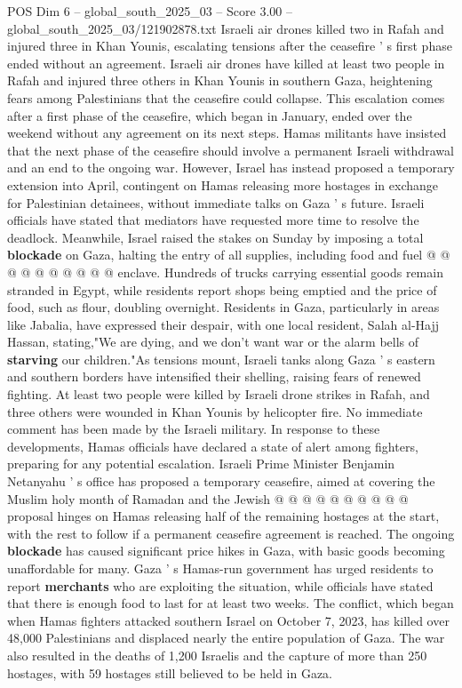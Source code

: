 \begin{textsample}{POS Dim 6 – global\_south\_2025\_03 – Score 3.00 – global\_south\_2025\_03/121902878.txt}  \label{ex:f6_pos_317}
Israeli air drones killed two in Rafah and injured three in Khan Younis, escalating tensions after the ceasefire ' s first phase ended without an agreement.
Israeli air drones have killed at least two people in Rafah and injured three others in Khan Younis in southern Gaza, heightening fears among Palestinians that the ceasefire could collapse.
This escalation comes after a first phase of the ceasefire, which began in January, ended over the weekend without any agreement on its next steps.
Hamas militants have insisted that the next phase of the ceasefire should involve a permanent Israeli withdrawal and an end to the ongoing war.
However, Israel has instead proposed a temporary extension into April, contingent on Hamas releasing more hostages in exchange for Palestinian detainees, without immediate talks on Gaza ' s future.
Israeli officials have stated that mediators have requested more time to resolve the deadlock.
Meanwhile, Israel raised the stakes on Sunday by imposing a total \textbf{blockade} on Gaza, halting the entry of all supplies, including food and fuel @ @ @ @ @ @ @ @ @ @ enclave.
Hundreds of trucks carrying essential goods remain stranded in Egypt, while residents report shops being emptied and the price of food, such as flour, doubling overnight.
Residents in Gaza, particularly in areas like Jabalia, have expressed their despair, with one local resident, Salah al-Hajj Hassan, stating,"We are dying, and we don't want war or the alarm bells of \textbf{starving} our children."As tensions mount, Israeli tanks along Gaza ' s eastern and southern borders have intensified their shelling, raising fears of renewed fighting.
At least two people were killed by Israeli drone strikes in Rafah, and three others were wounded in Khan Younis by helicopter fire.
No immediate comment has been made by the Israeli military.
In response to these developments, Hamas officials have declared a state of alert among fighters, preparing for any potential escalation.
Israeli Prime Minister Benjamin Netanyahu ' s office has proposed a temporary ceasefire, aimed at covering the Muslim holy month of Ramadan and the Jewish @ @ @ @ @ @ @ @ @ @ proposal hinges on Hamas releasing half of the remaining hostages at the start, with the rest to follow if a permanent ceasefire agreement is reached.
The ongoing \textbf{blockade} has caused significant price hikes in Gaza, with basic goods becoming unaffordable for many.
Gaza ' s Hamas-run government has urged residents to report \textbf{merchants} who are exploiting the situation, while officials have stated that there is enough food to last for at least two weeks.
The conflict, which began when Hamas fighters attacked southern Israel on October 7, 2023, has killed over 48,000 Palestinians and displaced nearly the entire population of Gaza.
The war also resulted in the deaths of 1,200 Israelis and the capture of more than 250 hostages, with 59 hostages still believed to be held in Gaza.

\end{textsample}

